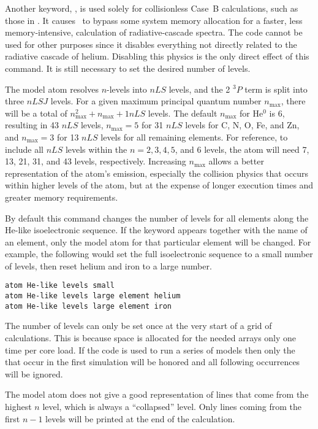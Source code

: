 Another keyword, , is used solely for collisionless Case~B
calculations, such as those in \citet{Bauman2005}.
It causes \Cloudy\ to
bypass some system memory allocation for a faster, less memory-intensive,
calculation of radiative-cascade spectra.
The code cannot be used for other
purposes since it disables everything not directly related to the radiative
cascade of helium.
Disabling this physics is the only direct effect of
this command.
It is still necessary to set the desired number of levels.

The model atom resolves $n$-levels into $nLS$ levels,
and the 2 $^3P$ term is split into three $nLSJ$ levels.
For a given maximum principal quantum number
$n_{\max}$, there will be a total of $n_{\max}^2 + n_{\max} +1 nLS$ levels.  The default $n_{\max}$ for He$^0$ is 6, resulting in
43 $nLS$ levels, $n_{\max} = 5$ for 31 $nLS$ levels
for C, N, O, Fe, and Zn, and $n_{\max} = 3$ for 13 $nLS$ levels
for all remaining elements.
For reference, to include all $nLS$ levels within the $n = 2, 3,
4, 5$, and 6 levels, the atom will need 7, 13, 21, 31, and 43 levels,
respectively.
Increasing $n_{\max}$ allows a better representation of the atom's
emission,
especially the collision physics that occurs within higher levels
of the atom,
but at the expense of longer execution times and greater memory
requirements.

By default this command changes the number of levels for all elements
along the He-like isoelectronic sequence.  If the keyword  appears
together with the name of an element, only the model atom for that particular
element will be changed.  For example, the following would set the full
isoelectronic sequence to a small number of levels, then reset helium and
iron to a large number.
\begin{verbatim}
atom He-like levels small
atom He-like levels large element helium
atom He-like levels large element iron
\end{verbatim}

The number of levels can only be set once at the very start of a grid
of calculations.
This is because space is allocated for the needed arrays
only one time per core load.
If the code is used to run a series of models
then only the  that occur in the first simulation will
be honored and all following occurrences will be ignored.

The model atom does not give a good representation of lines that come
from the highest $n$ level, which is always a ``collapsed'' level.
Only lines
coming from the first $n - 1$ levels will be printed at the end of the
calculation.

